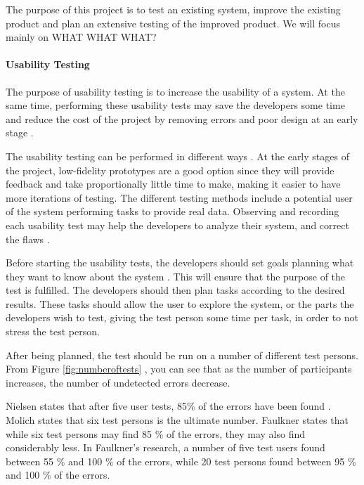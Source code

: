 The purpose of this project is to test an existing system, improve the existing product and plan an extensive testing of the improved product. We will focus mainly on WHAT WHAT WHAT?

\paragraph{Usability Testing}
The purpose of usability testing is to increase the usability of a system. At the same time, performing these usability tests may save the developers some time and reduce the cost of the project by removing errors and poor design at an early stage \cite{dumas1995practical}.

The usability testing can be performed in different ways \cite{schneidermanusercentered}. At the early stages of the project, low-fidelity prototypes are a good option since they will provide feedback and take proportionally little time to make, making it easier to have more iterations of testing. The different testing methods include a potential user of the system performing tasks to provide real data. Observing and recording each usability test may help the developers to analyze their system, and correct the flaws \cite{dumas1995practical}. 

Before starting the usability tests, the developers should set goals planning what they want to know about the system \cite{isosoftwareengineering}. This will ensure that the purpose of the test is fulfilled. The developers should then plan tasks according to the desired results. These tasks should allow the user to explore the system, or the parts the developers wish to test, giving the test person some time per task, in order to not stress the test person. 

After being planned, the test should be run on a number of different test persons. From Figure \ref{fig:numberoftests}
, you can see that as the number of participants increases, the number of undetected errors decrease. 



Nielsen states that after five user tests, 85\% of the errors have been found \cite{nielsennumberoftests}. Molich\cite{molich2008usable} states that six test persons is the ultimate number. Faulkner \cite{faulkner2003beyond} states that while six test persons may find 85 \% of the errors, they may also find considerably less. In Faulkner's research, a number of five test users found between 55 \% and 100 \% of the errors, while 20 test persons found between 95 \% and 100 \% of the errors. 

